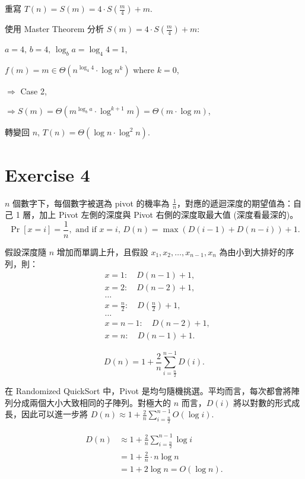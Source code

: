 \documentclass[8pt, fleqn]{report}
\begin{document}
重寫 \(T(n) = S(m) = 4 \cdot S(\frac{m}{4}) + m\).

使用 Master Theorem 分析 \(S(m) = 4 \cdot S(\frac{m}{4}) + m\):

\(a = 4, \, b = 4, \, \log_b{a} = \log_4{4} = 1\),

\(f(m) = m \in \Theta(n^{\log_4{4}} \cdot \log{n}^k)\) where \(k = 0\),

\(\Rightarrow\) Case 2,

\(\Rightarrow S(m) = \Theta(m^{\log_b{a}} \cdot \log^{k+1}{m}) = \Theta(m \cdot \log{m})\),

轉變回 \(n\), \(T(n) = \Theta(\log{n} \cdot \log^2{n})\).

\section*{Exercise 4}
\(n\) 個數字下，每個數字被選為 pivot 的機率為 \(\frac{1}{n}\)，對應的遞迴深度的期望值為：自己 1 層，加上 Pivot 左側的深度與 Pivot 右側的深度取最大值 (深度看最深的)。
\[
    \Pr[x = i] = \frac{1}{n}, \text{ and if } x = i, \, D(n) = \max (D(i-1) + D(n-i)) + 1.
\]

假設深度隨 \(n\) 增加而單調上升，且假設 \(x_1, x_2, \dots, x_{n-1}, x_n\) 為由小到大排好的序列，則：
\begin{align*}
     & x = 1: \quad D(n-1) + 1,                   \\
     & x = 2: \quad D(n-2) + 1,                   \\
     & \dots                                      \\
     & x = \frac{n}{2}: \quad D(\frac{n}{2}) + 1, \\
     & \dots                                      \\
     & x = n-1: \quad D(n-2) + 1,                 \\
     & x = n: \quad D(n-1) + 1.
\end{align*}

\[
    D(n) = 1 + \frac{2}{n} \sum_{i=\frac{n}{2}}^{n-1} D(i).
\]

在 Randomized QuickSort 中，Pivot 是均勻隨機挑選。平均而言，每次都會將陣列分成兩個大小大致相同的子陣列。對極大的 \(n\) 而言，\(D(i)\) 將以對數的形式成長，因此可以進一步將 \(D(n) \approx 1 + \frac{2}{n} \sum_{i=\frac{n}{2}}^{n-1} O(\log{i})\).

\begin{align*}
    D(n) & \approx 1 + \frac{2}{n} \sum_{i=\frac{n}{2}}^{n-1} \log{i} \\
         & = 1 + \frac{2}{n} \cdot n \log{n}                          \\
         & = 1 + 2 \log{n} = O(\log{n}).
\end{align*}
\end{document}
